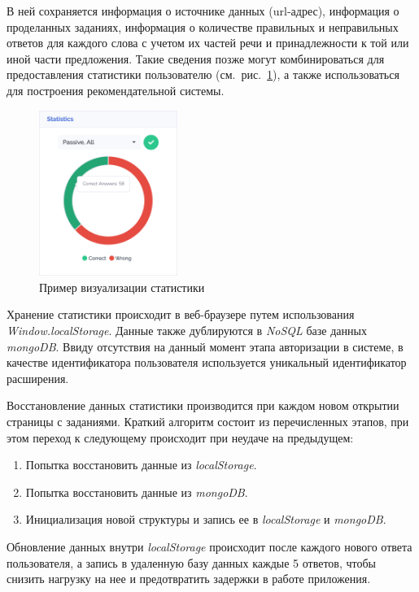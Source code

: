 В ней сохраняется информация о источнике данных (url-адрес), информация о проделанных заданиях, информация о количестве правильных и неправильных ответов для каждого слова с учетом их частей речи и принадлежности к той или иной части предложения. Такие сведения позже могут комбинироваться для предоставления статистики пользователю (см.~рис.~\ref{fig:stats-passive}), а также использоваться для построения рекомендательной системы.

\begin{figure}[ht]
\centering
\includegraphics[width=0.4\textwidth]{img/stats}
\caption{\label{fig:stats-passive}Пример визуализации статистики}
\end{figure}

Хранение статистики происходит в веб-браузере путем использования \emph{Window.localStorage}. Данные также дублируются в \emph{NoSQL} базе данных \emph{mongoDB}. Ввиду отсутствия на данный момент этапа авторизации в системе, в качестве идентификатора пользователя используется уникальный идентификатор расширения.

Восстановление данных статистики производится при каждом новом открытии страницы с заданиями. Краткий алгоритм состоит из перечисленных этапов, при этом переход к следующему происходит при неудаче на предыдущем:
\begin{enumerate}
  \item Попытка восстановить данные из \emph{localStorage}.
  \item Попытка восстановить данные из \emph{mongoDB}.
  \item Инициализация новой структуры и запись ее в \emph{localStorage} и \emph{mongoDB}.
\end{enumerate}

Обновление данных внутри \emph{localStorage} происходит после каждого нового ответа пользователя, а запись в удаленную базу данных каждые 5 ответов, чтобы снизить нагрузку на нее и предотвратить задержки в работе приложения.
